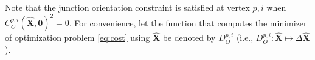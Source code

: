 \noindent Note that the junction orientation constraint is satisfied at vertex $p,i$ when $C^{p,i}_{O}(\hat{\mathbf{X}}, \mathbf{0})^2 = 0$.
For convenience, let the function that computes the minimizer of optimization problem \eqref{eq:cost} using $\hat{\mathbf{X}}$ be denoted by $D^{p,i}_O$ (i.e., $D^{p,i}_O: \hat{\mathbf{X}} \mapsto \Delta \hat{\mathbf{X}}$). 

